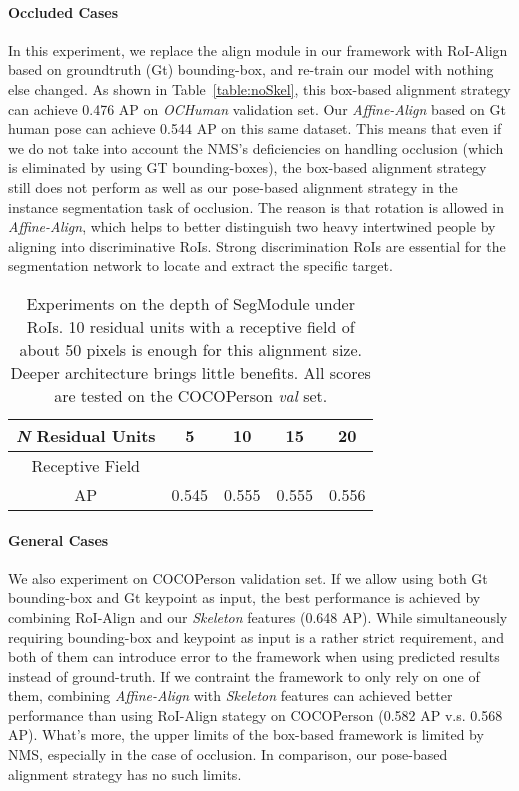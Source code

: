 \documentclass[10pt,twocolumn,letterpaper]{article}
\begin{document}
\paragraph{Occluded Cases} In this experiment, we replace the align module in our framework with RoI-Align based on groundtruth (Gt) bounding-box, and re-train our model with nothing else changed. As shown in Table~\ref{table:noSkel}, this box-based alignment strategy can achieve 0.476 AP on \emph{OCHuman} validation set. Our \emph{Affine-Align} based on Gt human pose can achieve 0.544 AP on this same dataset. This means that even if we do not take into account the NMS's deficiencies on handling occlusion (which is eliminated by using GT bounding-boxes), the box-based alignment strategy still does not perform as well as our pose-based alignment strategy in the instance segmentation task of occlusion. The reason is that rotation is allowed in \emph{Affine-Align}, which helps to better distinguish two heavy intertwined people by aligning into discriminative RoIs. Strong discrimination RoIs are essential for the segmentation network to  locate and extract the specific target. 

\setlength{\tabcolsep}{8pt}
\begin{table}[t]
\small
\begin{center}
\begin{tabular}{ccccc}
\toprule[1.5pt]
\emph{N} Residual Units & 5 & 10 & 15 & 20 \\
\midrule[0.5pt]
Receptive Field   &  &  &  &   \\
\midrule[0.5pt]
AP   & 0.545 & 0.555 & 0.555 & 0.556  \\
\bottomrule[1.5pt]
\end{tabular}
\end{center}
\setlength{\abovecaptionskip}{-0.1cm}
\setlength{\belowcaptionskip}{-0.5cm}
\caption{Experiments on the depth of SegModule under  RoIs. 10 residual units with a receptive field of about 50 pixels is enough for this alignment size. Deeper architecture brings little benefits. All scores are tested on the COCOPerson \emph{val} set.}
\label{table:segmodule}
\end{table}


\vspace{-0.3cm}
\paragraph{General Cases} We also experiment on COCOPerson validation set. If we allow using both Gt bounding-box and Gt keypoint as input, the best performance is achieved by combining RoI-Align and our \emph{Skeleton} features (0.648 AP).  While simultaneously requiring bounding-box and keypoint as input is a rather strict requirement, and both of them can introduce error to the framework when using predicted results instead of ground-truth. If we contraint the framework to only rely on one of them, combining \emph{Affine-Align} with \emph{Skeleton} features can achieved better performance than using RoI-Align stategy on COCOPerson (0.582 AP v.s. 0.568 AP). What's more, the upper limits of the box-based framework is limited by NMS, especially in the case of occlusion. In comparison, our pose-based alignment strategy has no such limits.
\vspace{-0.3cm}
\end{document}
